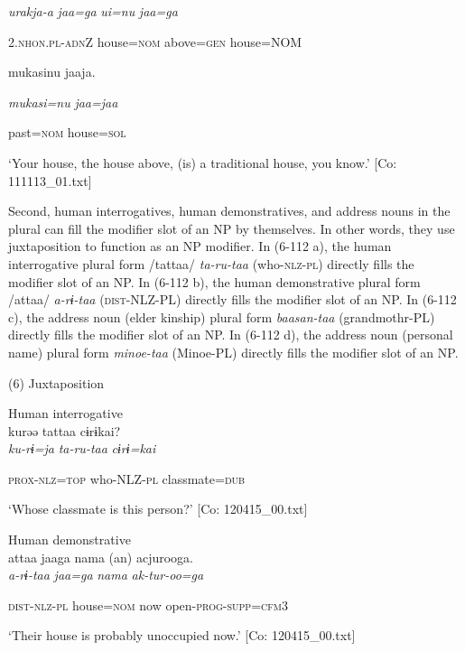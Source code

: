       \textit{urakja-a}  \textit{jaa=ga}  \textit{ui=nu}  \textit{jaa=ga}

      2.\textsc{nhon}.\textsc{pl}-\textsc{adn}Z  house=\textsc{nom}  above=\textsc{gen}  house=NOM

      mukasinu  jaaja.

      \textit{mukasi=nu}  \textit{jaa=jaa}

      past=\textsc{nom}  house=\textsc{sol}

\glt ‘Your house, the house above, (is) a traditional house, you know.’ [Co: 111113\_01.txt]
\z

  Second, human interrogatives, human demonstratives, and address nouns in the plural can fill the modifier slot of an NP by themselves. In other words, they use juxtaposition to function as an NP modifier. In (6-112 a), the human interrogative plural form /tattaa/ \textit{ta-ru-taa} (who-\textsc{nlz}-\textsc{pl}) directly fills the modifier slot of an NP. In (6-112 b), the human demonstrative plural form /attaa/ \textit{a-rɨ-taa} (\textsc{dist}-NLZ-PL) directly fills the modifier slot of an NP. In (6-112 c), the address noun (elder kinship) plural form \textit{baasan-taa} (grandmothr-PL) directly fills the modifier slot of an NP. In (6-112 d), the address noun (personal name) plural form \textit{minoe-taa} (Minoe-PL) directly fills the modifier slot of an NP.

(6)  Juxtaposition

 \ea Human interrogative\\
{\TM}
\gll  kurəə  tattaa  cɨrɨkai?\\

      \textit{ku-rɨ=ja}  \textit{ta-ru-taa}  \textit{cɨrɨ=kai}

      \textsc{prox}-\textsc{nlz}=\textsc{top}  who-NLZ-\textsc{pl}  classmate=\textsc{dub}

\glt ‘Whose classmate is this person?’ [Co: 120415\_00.txt]
\z

 \ex Human demonstrative\\
{\TM}
\gll  attaa  jaaga  nama  (an)  acjurooga.\\

      \textit{a-rɨ-taa}  \textit{jaa=ga}  \textit{nama}    \textit{ak-tur-oo=ga}

      \textsc{dist}-\textsc{nlz}-\textsc{pl}  house=\textsc{nom}  now    open-\textsc{prog}-\textsc{supp}=\textsc{cfm}3

\glt ‘Their house is probably unoccupied now.’ [Co: 120415\_00.txt]
\z

